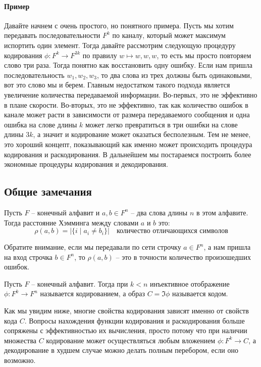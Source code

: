 \paragraph{Пример}

Давайте начнем с очень простого, но понятного примера.
Пусть мы хотим передавать последовательности $F^k$ по каналу, который может максимум испортить один элемент.
Тогда давайте рассмотрим следующую процедуру кодирования $\phi\colon F^k \to F^{3k}$ по правилу $w\mapsto w, w, w$, то есть мы просто повторяем слово три раза.
Тогда понятно как восстановить одну ошибку.
Если нам пришла последовательность $w_1, w_2, w_3$, то два слова из трех должны быть одинаковыми, вот это слово мы и берем.
Главным недостатком такого подхода является увеличение количества передаваемой информации.
Во-первых, это не эффективно в плане скорости.
Во-вторых, это не эффективно, так как количество ошибок в канале может расти в зависимости от размера передаваемого сообщения и одна ошибка на слове длины $k$ может легко превратиться в три ошибки на слове длины $3k$, а значит и кодирование может оказаться бесполезным.
Тем не менее, это хороший концепт, показывающий как именно может происходить процедура кодирования и раскодирования.
В дальнейшем мы постараемся построить более экономные процедуры кодирования и декодирования.

\subsection{Общие замечания}

\begin{definition}
\label{def::HammingDist}
Пусть $F$ -- конечный алфавит и $a, b\in F^n$ -- два слова длины $n$ в этом алфавите.
Тогда расстояние Хэмминга между словами $a$ и $b$ это:
\[
\rho(a, b) = |\{i \mid a_i \neq b_i\}|\quad\text{количество отличающихся символов}
\]
\end{definition}

Обратите внимание, если мы передавали по сети строчку $a\in F^n$, а нам пришла на вход строчка $b\in F^n$, то $\rho(a, b)$ -- это в точности количество произошедших ошибок.

\begin{definition}
\label{def::Coding}
Пусть $F$ -- конечный алфавит.
Тогда при $k < n$ инъективное отображение $\phi\colon F^k \to F^n$ называется кодированием, а образ $C = \Im \phi$ называется кодом.
\end{definition}

Как мы увидим ниже, многие свойства кодирования зависят именно от свойств кода $C$.
Вопросы нахождения функции кодирования и раскодирования больше сопряжены с эффективностью их вычисления, просто потому что при наличии множества $C$ кодирование может осуществляться любым вложением $\phi \colon F^k \to C$, а декодирование в худшем случае можно делать полным перебором, если оно возможно.

